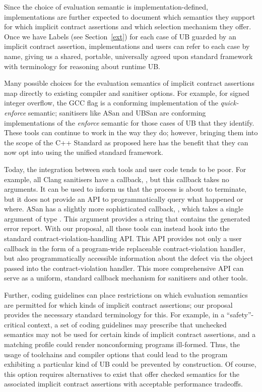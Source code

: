 Since the choice of evaluation semantic is  implementation-defined, implementations are further expected to document which semantics they support for which implicit contract assertions and which selection mechanism they offer. Once we have Labels (see Section~\ref{ext}) for each case of UB guarded by an implicit contract assertion, implementations and users can refer to each case by name, giving us a shared, portable, universally agreed upon standard framework with terminology for reasoning about runtime UB.

Many possible choices for the evaluation semantics of implicit contract assertions map directly to existing compiler and sanitiser options. For example, for signed integer overflow, the GCC flag  is a conforming implementation of the \emph{quick-enforce} semantic; sanitisers like ASan and UBSan are conforming implementations of the \emph{enforce} semantic for those cases of UB that they identify. These tools can continue to work in the way they do; however, bringing them into the scope of the C++ Standard as proposed here has the benefit that they can now opt into using the unified standard framework.

Today, the integration between such tools and user code tends to be poor. For example, all Clang sanitisers have a callback, , but this callback takes no arguments. It can be used to inform us that the process is about to terminate, but it does not provide an API to programmatically query what happened or where. ASan has a slightly more sophisticated callback, , which takes a single argument of type . This argument provides a string that contains the generated error report. With our proposal, all these tools can instead hook into the standard contract-violation-handling API. This API provides not only a user callback in the form of a  program-wide replaceable contract-violation handler, but also programmatically accessible information about the defect via the  \mbox{} object passed into the contract-violation handler. This more comprehensive API can serve as a uniform, standard callback mechanism for sanitisers and other tools.

Further, coding guidelines can place restrictions on which evaluation semantics are permitted for which kinds of implicit contract assertions; our proposal provides the necessary standard terminology for this. For example, in a ``safety''-critical context, a set of coding guidelines may prescribe that unchecked semantics may not be used for certain kinds of implicit contract assertions, and a matching profile could render nonconforming programs ill-formed. Thus, the usage of toolchains and compiler options that could lead to the program exhibiting a particular kind of UB could be prevented by construction. Of course, this option requires alternatives to exist that offer checked semantics for the associated implicit contract assertions with acceptable performance tradeoffs.

